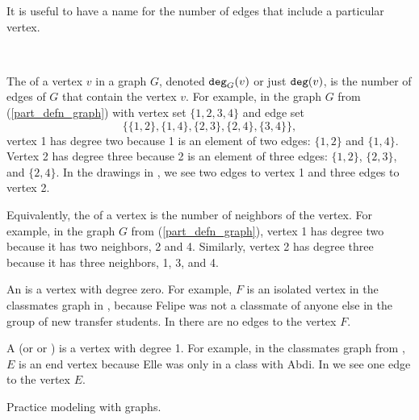 It is useful to have a name for the number of edges that include a particular vertex.

\begin{defn}
\label{defn_degree}   
~
    \begin{apart}
        \item The  of a vertex $v$ in a graph $G$, denoted $\texttt{deg}_G(v)$ or just $\texttt{deg}(v)$, is the number of edges of $G$ that contain the vertex $v$.  For example, in the graph $G$ from  (\ref{part_defn_graph}) with vertex set $\{1,2,3,4\}$ and edge set $$\{\{1,2\}, \{1,4\},\{2,3\},\{2,4\},\{3,4\}\},$$ vertex 1 has degree two because 1 is an element of two edges: $\{1,2\}$ and $\{1,4\}$.  Vertex 2 has degree three because 2 is an element of three edges: $\{1,2\}$, $\{2,3\}$, and $\{2,4\}$. In the drawings in , we see two edges to vertex 1 and three edges to vertex 2.
        \item Equivalently, the  of a vertex is the number of neighbors of the vertex. For example, in the graph $G$ from  (\ref{part_defn_graph}), vertex 1 has degree two because it has two neighbors, 2 and 4.  Similarly, vertex 2 has degree three because it has three neighbors, 1, 3, and 4.
        \item An  is a vertex with degree zero.  For example, $F$ is an isolated vertex in the classmates graph in , because Felipe was not a classmate of anyone else in the group of new transfer students. In  there are no edges to the vertex $F$.
        \item A  (or  or ) is a vertex with degree 1. For example, in the classmates graph from , $E$ is an end vertex because Elle was only in a class with Abdi. In  we see one edge to the vertex $E$.
    \end{apart}
\end{defn}

Practice modeling with graphs.


